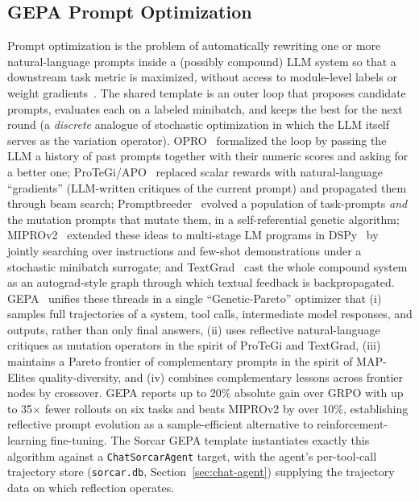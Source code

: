 \documentclass{article}
\begin{document}
\subsection{GEPA Prompt Optimization}
\label{sec:gepa}

Prompt optimization is the problem of automatically rewriting one or more natural-language prompts inside a (possibly compound) LLM system so that a downstream task metric is maximized, without access to module-level labels or weight gradients~\citep{yang2024opro,pryzant2023apo,fernando2023promptbreeder,opsahlong2024mipro,yuksekgonul2024textgrad,khattab2024dspy,agrawal2025gepa}.  The shared template is an outer loop that proposes candidate prompts, evaluates each on a labeled minibatch, and keeps the best for the next round (a \emph{discrete} analogue of stochastic optimization in which the LLM itself serves as the variation operator).  OPRO~\citep{yang2024opro} formalized the loop by passing the LLM a history of past prompts together with their numeric scores and asking for a better one; ProTeGi/APO~\citep{pryzant2023apo} replaced scalar rewards with natural-language ``gradients'' (LLM-written critiques of the current prompt) and propagated them through beam search; Promptbreeder~\citep{fernando2023promptbreeder} evolved a population of task-prompts \emph{and} the mutation prompts that mutate them, in a self-referential genetic algorithm; MIPROv2~\citep{opsahlong2024mipro} extended these ideas to multi-stage LM programs in DSPy~\citep{khattab2024dspy} by jointly searching over instructions and few-shot demonstrations under a stochastic minibatch surrogate; and TextGrad~\citep{yuksekgonul2024textgrad} cast the whole compound system as an autograd-style graph through which textual feedback is backpropagated.  GEPA~\citep{agrawal2025gepa} unifies these threads in a single ``Genetic-Pareto'' optimizer that (i) samples full trajectories of a system, tool calls, intermediate model responses, and outputs, rather than only final answers, (ii) uses reflective natural-language critiques as mutation operators in the spirit of ProTeGi and TextGrad, (iii) maintains a Pareto frontier of complementary prompts in the spirit of MAP-Elites quality-diversity, and (iv) combines complementary lessons across frontier nodes by crossover.  GEPA reports up to 20\% absolute gain over GRPO with up to 35$\times$ fewer rollouts on six tasks and beats MIPROv2 by over 10\%, establishing reflective prompt evolution as a sample-efficient alternative to reinforcement-learning fine-tuning.  The Sorcar GEPA template instantiates exactly this algorithm against a \texttt{ChatSorcarAgent} target, with the agent's per-tool-call trajectory store (\texttt{sorcar.db}, Section~\ref{sec:chat-agent}) supplying the trajectory data on which reflection operates.
\end{document}
